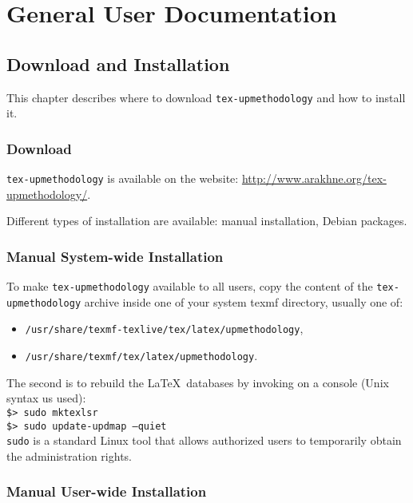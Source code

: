 \documentclass[book]{upmethodology-document}
\begin{document}
\part{General User Documentation}

\chapter{Download and Installation}

This chapter describes where to download \texttt{tex-upmethodology} and how to install it.

\section{Download}

\texttt{tex-upmethodology} is available on the \arakhneorg website: \url{http://www.arakhne.org/tex-upmethodology/}.

Different types of installation are available: manual installation, Debian packages.

\section{Manual System-wide Installation}

To make \texttt{tex-upmethodology} available to all users, copy the content of the \texttt{tex-upmethodology} archive inside one of your system texmf directory, usually one of:
\begin{itemize}
\item \texttt{/usr/share/texmf-texlive/tex/latex/upmethodology},
\item \texttt{/usr/share/texmf/tex/latex/upmethodology}.
\end{itemize}

The second is to rebuild the \LaTeX\ databases by invoking on a console (Unix syntax us used): \\
\texttt{\$> sudo mktexlsr}\\
\texttt{\$> sudo update-updmap --quiet}\\

\texttt{sudo} is a standard Linux tool that allows authorized users to temporarily obtain the administration rights.

\section{Manual User-wide Installation}
\end{document}
